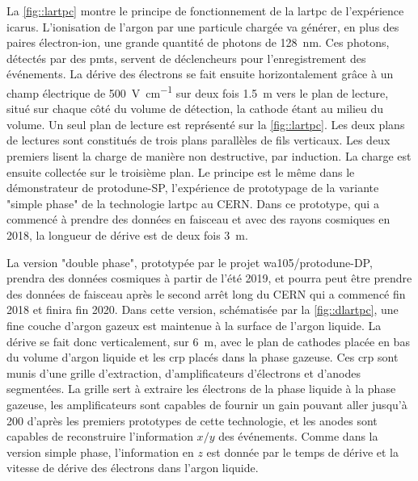     La \autoref{fig::lartpc} montre le principe de fonctionnement de la \gls{lartpc} de l'expérience \gls{icarus}. L'ionisation de l'argon par une particule chargée va générer, en plus des paires électron-ion, une grande quantité de photons de \SI{128}{\nano\meter}. Ces photons, détectés par des \glspl{pmt}, servent de déclencheurs pour l'enregistrement des événements. La dérive des électrons se fait ensuite horizontalement grâce à un champ électrique de \SI{500}{\volt\per\centi\meter} sur deux fois \SI{1.5}{\meter} vers le plan de lecture, situé sur chaque côté du volume de détection, la cathode étant au milieu du volume. Un seul plan de lecture est représenté sur la \autoref{fig::lartpc}. Les deux plans de lectures sont constitués de trois plans parallèles de fils verticaux. Les deux premiers lisent la charge de manière non destructive, par induction. La charge est ensuite collectée sur le troisième plan. Le principe est le même dans le démonstrateur de proto\gls{dune}-SP, l'expérience de prototypage de la variante "simple phase" de la technologie \gls{lartpc} au CERN. Dans ce prototype, qui a commencé à prendre des données en faisceau et avec des rayons cosmiques en 2018, la longueur de dérive est de deux fois \SI{3}{\meter}.

    La version "double phase", prototypée par le projet \gls{wa105}/proto\gls{dune}-DP, prendra des données cosmiques à partir de l'été 2019, et pourra peut être prendre des données de faisceau après le second arrêt long du CERN qui a commencé fin 2018 et finira fin 2020. Dans cette version, schématisée par la \autoref{fig::dlartpc}, une fine couche d'argon gazeux est maintenue à la surface de l'argon liquide. La dérive se fait donc verticalement, sur \SI{6}{\meter}, avec le plan de cathodes placée en bas du volume d'argon liquide et les \gls{crp} placés dans la phase gazeuse. Ces \gls{crp} sont munis d'une grille d'extraction, d'amplificateurs d'électrons et d'anodes segmentées. La grille sert à extraire les électrons de la phase liquide à la phase gazeuse, les amplificateurs sont capables de fournir un gain pouvant aller jusqu'à 200 d'après les premiers prototypes de cette technologie\cite{Cantini2014}, et les anodes sont capables de reconstruire l'information $x/y$ des événements. Comme dans la version simple phase, l'information en $z$ est donnée par le temps de dérive et la vitesse de dérive des électrons dans l'argon liquide.

